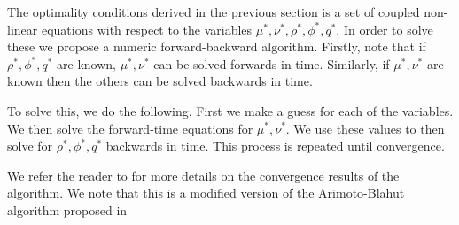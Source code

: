The optimality conditions derived in the previous section is a set of coupled non-linear equations with respect to the variables $\mu^{*},\nu^*,\rho^*,\phi^*,q^*$. In order to solve these we propose a numeric forward-backward algorithm. Firstly, note that if $\rho^*,\phi^*,q^*$ are known, $\mu^{*},\nu^*$ can be solved forwards in time. Similarly, if $\mu^{*},\nu^*$ are known then the others can be solved backwards in time. 

To solve this, we do the following. First we make a guess for each of the variables. We then solve the forward-time equations for $\mu^{*},\nu^*$. We use these values to then solve for $\rho^*,\phi^*,q^*$ backwards in time. This process is repeated until convergence. 

We refer the reader to \cite{takashi17} for more details on the convergence results of the algorithm. We note that this is a modified version of the Arimoto-Blahut algorithm proposed in \cite{Naiss13}
